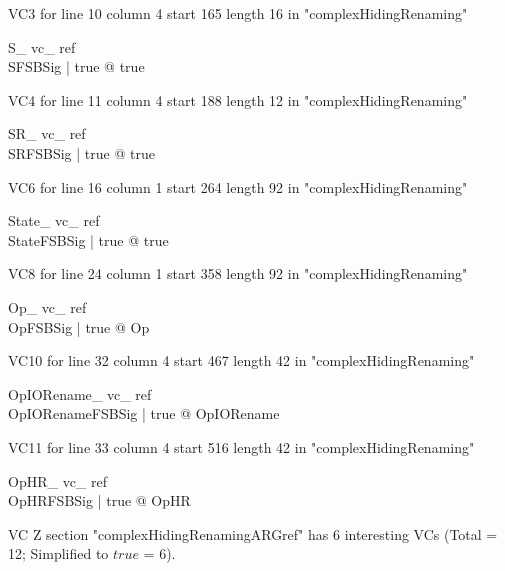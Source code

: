 \documentclass{article}
\begin{document}
VC3 for line 10 column 4 start 165 length 16 in "complexHidingRenaming"
\begin{theorem}{ S\_ vc\_ ref}\\
 \exists SFSBSig | true @ true \\

\end{theorem}

VC4 for line 11 column 4 start 188 length 12 in "complexHidingRenaming"
\begin{theorem}{ SR\_ vc\_ ref}\\
 \exists SRFSBSig | true @ true \\

\end{theorem}

VC6 for line 16 column 1 start 264 length 92 in "complexHidingRenaming"
\begin{theorem}{ State\_ vc\_ ref}\\
 \exists StateFSBSig | true @ true \\

\end{theorem}

VC8 for line 24 column 1 start 358 length 92 in "complexHidingRenaming"
\begin{theorem}{ Op\_ vc\_ ref}\\
 \forall OpFSBSig | true @ \pre Op \\

\end{theorem}

VC10 for line 32 column 4 start 467 length 42 in "complexHidingRenaming"
\begin{theorem}{ OpIORename\_ vc\_ ref}\\
 \forall OpIORenameFSBSig | true @ \pre OpIORename \\

\end{theorem}

VC11 for line 33 column 4 start 516 length 42 in "complexHidingRenaming"
\begin{theorem}{ OpHR\_ vc\_ ref}\\
 \forall OpHRFSBSig | true @ \pre OpHR \\

\end{theorem}



 VC Z section "complexHidingRenamingARGref" has $6$ interesting VCs (Total = 12; Simplified to $true$ = 6).



\end{document}
